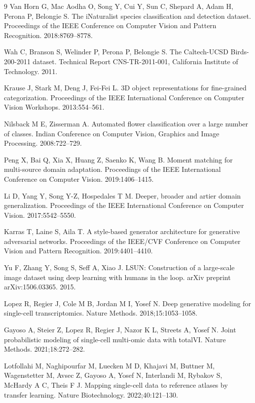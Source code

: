 \documentclass{article}
\begin{document}
\begin{thebibliography}{9}
Van Horn G, Mac Aodha O, Song Y, Cui Y, Sun C, Shepard A, Adam H, Perona P, Belongie S. The iNaturalist species classification and detection dataset. Proceedings of the IEEE Conference on Computer Vision and Pattern Recognition. 2018:8769--8778.

Wah C, Branson S, Welinder P, Perona P, Belongie S. The Caltech-UCSD Birds-200-2011 dataset. Technical Report CNS-TR-2011-001, California Institute of Technology. 2011.

Krause J, Stark M, Deng J, Fei-Fei L. 3D object representations for fine-grained categorization. Proceedings of the IEEE International Conference on Computer Vision Workshops. 2013:554--561.

Nilsback M E, Zisserman A. Automated flower classification over a large number of classes. Indian Conference on Computer Vision, Graphics and Image Processing. 2008:722--729.

Peng X, Bai Q, Xia X, Huang Z, Saenko K, Wang B. Moment matching for multi-source domain adaptation. Proceedings of the IEEE International Conference on Computer Vision. 2019:1406--1415.

Li D, Yang Y, Song Y-Z, Hospedales T M. Deeper, broader and artier domain generalization. Proceedings of the IEEE International Conference on Computer Vision. 2017:5542--5550.

Karras T, Laine S, Aila T. A style-based generator architecture for generative adversarial networks. Proceedings of the IEEE/CVF Conference on Computer Vision and Pattern Recognition. 2019:4401--4410.

Yu F, Zhang Y, Song S, Seff A, Xiao J. LSUN: Construction of a large-scale image dataset using deep learning with humans in the loop. arXiv preprint arXiv:1506.03365. 2015.

Lopez R, Regier J, Cole M B, Jordan M I, Yosef N. Deep generative modeling for single-cell transcriptomics. Nature Methods. 2018;15:1053--1058.

Gayoso A, Steier Z, Lopez R, Regier J, Nazor K L, Streets A, Yosef N. Joint probabilistic modeling of single-cell multi-omic data with totalVI. Nature Methods. 2021;18:272--282.

Lotfollahi M, Naghipourfar M, Luecken M D, Khajavi M, Buttner M, Wagenstetter M, Avsec Z, Gayoso A, Yosef N, Interlandi M, Rybakov S, McHardy A C, Theis F J. Mapping single-cell data to reference atlases by transfer learning. Nature Biotechnology. 2022;40:121--130.


\end{thebibliography}
\end{document}
